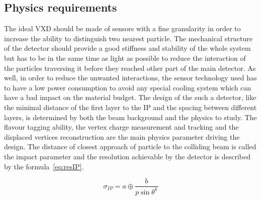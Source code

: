    \subsection{Physics requirements}

   The ideal \gls{VXD} should be made of sensors with a fine granularity in order to increase the ability to distinguish two nearest particle.
   The mechanical structure of the detector should provide a good stiffness and stability of the whole system but has to be in the same time as light as possible to reduce the interaction of the particles traversing it before they reached other part of the main detector.
   As well, in order to reduce the unwanted interactions, the sensor technology used has to have a low power consumption to avoid any special cooling system which can have a bad impact on the material budget.
   The design of the such a detector, like the minimal distance of the first layer to the \gls{IP} and the spacing between different layers, is determined by both the beam background and the physics to study.
   The flavour tagging ability, the vertex charge measurement and tracking and the displaced vertices reconstruction are the main physics parameter driving the design.
   The distance of closest approach of particle to the colliding beam is called the impact parameter and the resolution achievable by the detector is described by the formula~\ref{eq:resIP}\cite{Battaglia2011}.
    
    \begin{equation}
      \sigma_{IP} = a \oplus \frac{b}{p \sin{\theta}^{k}} 
      \label{eq:resIP}
    \end{equation}
   
